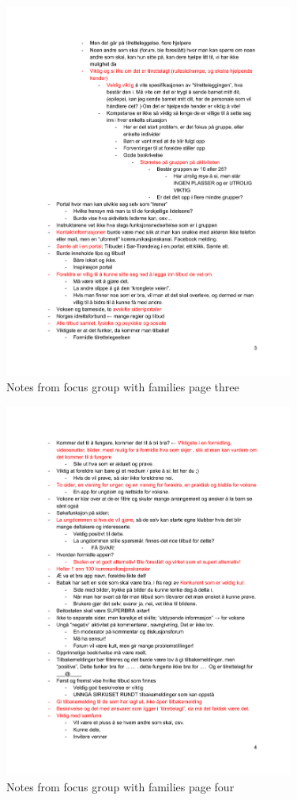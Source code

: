 \begin{figure}[H]
\centering
    \includegraphics[width=0.85\textwidth]{fig/workshop/users/WSBrukere_3.pdf}
    \caption{Notes from focus group with families page three}
    \label{Users_3}
\end{figure}

\begin{figure}[H]
\centering
    \includegraphics[width=0.85\textwidth]{fig/workshop/users/WSBrukere_4.pdf}
    \caption{Notes from focus group with families page four}
    \label{Users_4}
\end{figure}

